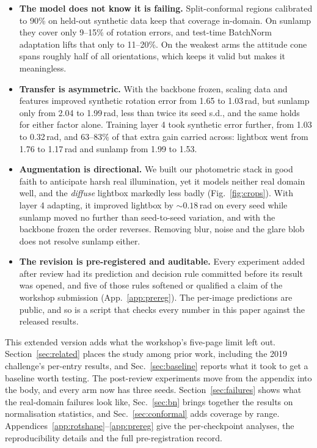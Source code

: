 \documentclass{article}
\begin{document}
\begin{itemize}[leftmargin=1.4em,itemsep=1pt,topsep=2pt]
  \item \textbf{The model does not know it is failing.} Split-conformal regions calibrated to
  90\% on held-out synthetic data keep that coverage in-domain. On sunlamp they cover only
  9--15\% of rotation errors, and test-time BatchNorm adaptation lifts that only to 11--20\%.
  On the weakest arms the attitude cone spans roughly half of all orientations, which keeps
  it valid but makes it meaningless.
  \item \textbf{Transfer is asymmetric.} With the backbone frozen, scaling data and features
  improved synthetic rotation error from 1.65 to 1.03\,rad, but sunlamp only from 2.04 to
  1.99\,rad, less than twice its seed s.d., and the same holds for either factor alone.
  Training layer 4 took synthetic error further, from 1.03 to 0.32\,rad, and 63--83\% of that
  extra gain carried across: lightbox went from 1.76 to 1.17\,rad and sunlamp from 1.99 to
  1.53.
  \item \textbf{Augmentation is directional.} We built our photometric stack in good faith to
  anticipate harsh real illumination, yet it models neither real domain well, and the
  \emph{diffuse} lightbox markedly less badly (Fig.~\ref{fig:crops}). With layer 4 adapting,
  it improved lightbox by ${\sim}0.18$\,rad on every seed while sunlamp moved no further than
  seed-to-seed variation, and with the backbone frozen the order reverses. Removing blur,
  noise and the glare blob does not resolve sunlamp either.
  \item \textbf{The revision is pre-registered and auditable.} Every experiment added after
  review had its prediction and decision rule committed before its result was opened, and
  five of those rules softened or qualified a claim of the workshop submission
  (App.~\ref{app:prereg}). The per-image predictions are public, and so is a script that
  checks every number in this paper against the released results.
\end{itemize}

This extended version adds what the workshop's five-page limit left out.
Section~\ref{sec:related} places the study among prior work, including the 2019 challenge's
per-entry results, and Sec.~\ref{sec:baseline} reports what it took to get a baseline worth
testing. The post-review experiments move from the appendix into the body, and every arm now
has three seeds. Section~\ref{sec:failures} shows what the real-domain failures look like,
Sec.~\ref{sec:bn} brings together the results on normalisation statistics, and
Sec.~\ref{sec:conformal} adds coverage by range.
Appendices~\ref{app:rotshape}--\ref{app:prereg} give the per-checkpoint analyses, the
reproducibility details and the full pre-registration record.
\end{document}
